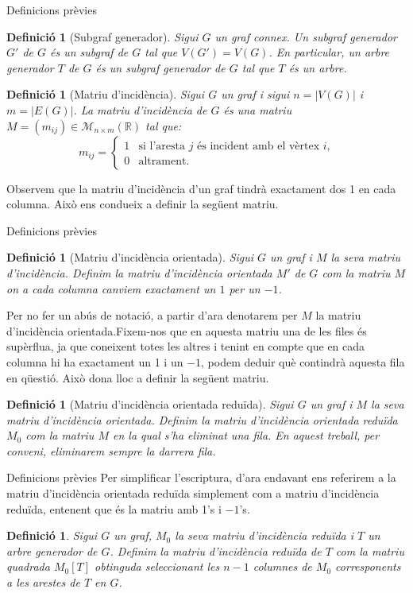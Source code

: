\documentclass{beamer}
\newtheorem{defin}[theorem]{Definició}
\begin{document}
\begin{frame}{Definicions prèvies}
    \begin{defin}[Subgraf generador]
        \normalfont Sigui $G$ un graf connex. Un subgraf generador $G'$ de $G$ és un subgraf de $G$ tal que $V(G')=V(G)$. En particular, un arbre generador $T$ de $G$ és un subgraf generador de $G$ tal que $T$ és un arbre.
    \end{defin}\pause
    \begin{defin}[Matriu d'incidència]
        \normalfont Sigui $G$ un graf i sigui $n=|V(G)|$ i $m=|E(G)|$. La matriu d'incidència de $G$ és una matriu $M=(m_{ij})\in\mathcal{M}_{n\times m}(\mathbb{R})$ tal que:
        $$m_{ij}=\left\{\begin{array}{ll}
            1 & \text{si l'aresta $j$ és incident amb el vèrtex $i$,} \\
            0 & \text{altrament.}
        \end{array}\right.$$
    \end{defin}\pause
    Observem que la matriu d'incidència d'un graf tindrà exactament dos 1 en cada columna. Això ens condueix a definir la següent matriu.
\end{frame}
\begin{frame}{Definicions prèvies}
    \begin{defin}[Matriu d'incidència orientada]
    \normalfont Sigui $G$ un graf i $M$ la seva matriu d'incidència. Definim la matriu d'incidència orientada $M'$ de $G$ com la matriu $M$ on a cada columna canviem exactament un $1$ per un $-1$.
    \end{defin}\pause
    Per no fer un abús de notació, a partir d'ara denotarem per $M$ la matriu d'incidència orientada.\pause\space Fixem-nos que en aquesta matriu una de les files és supèrflua, ja que coneixent totes les altres i tenint en compte que en cada columna hi ha exactament un 1 i un $-1$, podem deduir què contindrà aquesta fila en qüestió. Això dona lloc a definir la següent matriu.\pause
    \begin{defin}[Matriu d'incidència orientada reduïda]
    \normalfont Sigui $G$ un graf i $M$ la seva matriu d'incidència orientada. Definim la matriu d'incidència orientada reduïda $M_0$ com la matriu $M$ en la qual s'ha eliminat una fila.  En aquest treball, per conveni, eliminarem sempre la darrera fila.
    \end{defin}
\end{frame}
\begin{frame}{Definicions prèvies}
    Per simplificar l'escriptura, d'ara endavant ens referirem a la matriu d'incidència orientada reduïda simplement com a matriu d'incidència reduïda, entenent que és la matriu amb 1's i $-1$'s.\pause
    \begin{defin}
    \normalfont Sigui $G$ un graf, $M_0$ la seva matriu d'incidència reduïda i $T$ un arbre generador de $G$. Definim la matriu d'incidència reduïda de $T$ com la matriu quadrada $M_0[T]$ obtinguda seleccionant les $n-1$ columnes de $M_0$ corresponents a les arestes de $T$ en $G$.
    \end{defin}
\end{frame}
\end{document}
